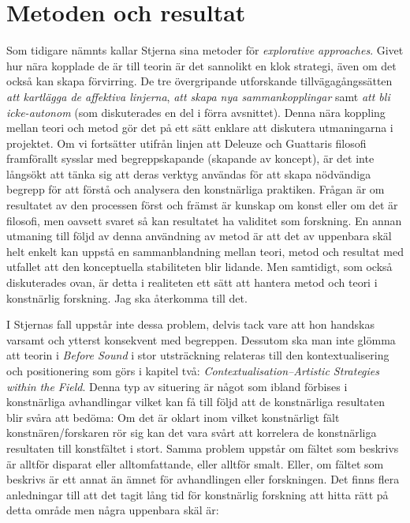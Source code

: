 \documentclass[11pt]{article}
\begin{document}
\section*{Metoden och resultat}
\label{sec:orgc2861a5}
Som tidigare nämnts kallar Stjerna sina metoder för \emph{explorative
    approaches}. Givet hur nära kopplade de är till teorin är det
sannolikt en klok strategi, även om det också kan skapa förvirring. De
tre övergripande utforskande tillvägagångssätten \emph{att kartlägga
    de affektiva linjerna}, \emph{att skapa nya sammankopplingar} samt
\emph{att bli icke-autonom} (som diskuterades en del i förra
avsnittet). Denna nära koppling mellan teori och metod gör det på ett
sätt enklare att diskutera utmaningarna i projektet. Om vi fortsätter
utifrån linjen att Deleuze och Guattaris filosofi framförallt sysslar
med begreppskapande (skapande av koncept), är det inte långsökt att
tänka sig att deras verktyg användas för att skapa nödvändiga begrepp
för att förstå och analysera den konstnärliga praktiken. Frågan är om
resultatet av den processen först och främst är kunskap om konst eller
om det är filosofi, men oavsett svaret så kan resultatet ha validitet
som forskning. En annan utmaning till följd av denna användning av
metod är att det av uppenbara skäl helt enkelt kan uppstå en
sammanblandning mellan teori, metod och resultat med utfallet att den
konceptuella stabiliteten blir lidande. Men samtidigt, som också
diskuterades ovan, är detta i realiteten ett sätt att hantera metod
och teori i konstnärlig forskning. Jag ska återkomma till
det. %

I Stjernas fall uppstår inte dessa problem, delvis tack vare att hon
handskas varsamt och ytterst konsekvent med begreppen. Dessutom ska
man inte glömma att teorin i \emph{Before Sound} i stor utsträckning
relateras till den kontextualisering och positionering som görs i
kapitel två: \emph{Contextualisation--Artistic Strategies within the
    Field}. Denna typ av situering är något som ibland förbises i
konstnärliga avhandlingar vilket kan få till följd att de konstnärliga
resultaten blir svåra att bedöma: Om det är oklart inom vilket
konstnärligt fält konstnären/forskaren rör sig kan det vara svårt att
korrelera de konstnärliga resultaten till konstfältet i stort. Samma
problem uppstår om fältet som beskrivs är alltför disparat eller
alltomfattande, eller alltför smalt. Eller, om fältet som beskrivs är
ett annat än ämnet för avhandlingen eller forskningen. Det finns flera
anledningar till att det tagit lång tid för konstnärlig forskning att
hitta rätt på detta område men några uppenbara skäl är:
\end{document}
